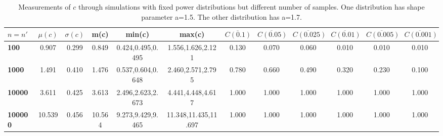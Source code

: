 \begin{table*}[h!]
\begin{center}
\begin{tabular}{| l | c | c | c | c | c | c | c | c | c | c | c |}\hline
$n=n'$ & $\mu(c)$ & $\sigma(c)$ & m(c) & min(c) & max(c) & $\overline{C(0.1)}$ & $\overline{C(0.05)}$ & $\overline{C(0.025)}$ & $\overline{C(0.01)}$ & $\overline{C(0.005)}$ & $\overline{C(0.001)}$ \\\hline\hline
{\bf 100} & 0.907 & 0.299 & 0.849 & 0.424,0.495,0.495 & 1.556,1.626,2.121 & 0.130 & 0.070 & 0.060 & 0.010 & 0.010 & 0.010 \\\hline
{\bf 1000} & 1.491 & 0.410 & 1.476 & 0.537,0.604,0.648 & 2.460,2.571,2.795 & 0.780 & 0.660 & 0.490 & 0.320 & 0.230 & 0.100 \\\hline
{\bf 10000} & 3.611 & 0.425 & 3.613 & 2.496,2.623,2.673 & 4.441,4.448,4.617 & 1.000 & 1.000 & 1.000 & 1.000 & 1.000 & 1.000 \\\hline
{\bf 100000} & 10.539 & 0.456 & 10.564 & 9.273,9.429,9.465 & 11.348,11.435,11.697 & 1.000 & 1.000 & 1.000 & 1.000 & 1.000 & 1.000 \\\hline
\end{tabular}
\caption{Measurements of $c$ through simulations
        with fixed power distributions but different number of samples.
        One distribution has shape parameter a=1.5.
        The other distribution has a=1.7.}
\end{center}
\end{table*}